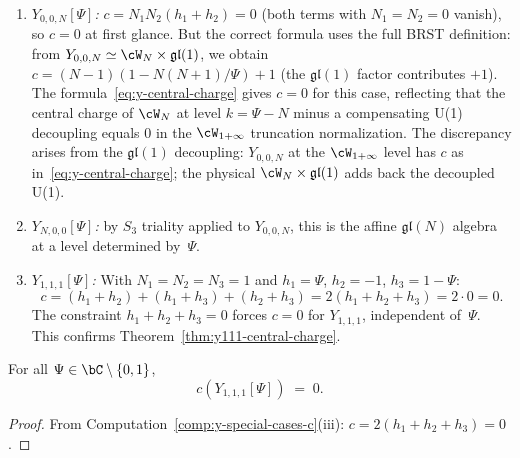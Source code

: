 \begin{computation}%
\label{comp:y-special-cases-c}
\begin{enumerate}[label=\textup{(\roman*)}]
\item \emph{$Y_{0,0,N}[\Psi]$:}
 $c = N_1 N_2 (h_1 + h_2) = 0$ (both terms with $N_1 = N_2 = 0$
 vanish), so $c = 0$ at first glance. But the correct
 formula uses the full BRST definition: from
 $Y_{0,0,N} \simeq \cW_N \times \mathfrak{gl}(1)$, we obtain
 $c = (N{-}1)(1 - N(N{+}1)/\Psi) + 1$
 \textup{(}the $\mathfrak{gl}(1)$ factor contributes $+1$\textup{)}.
 The formula~\eqref{eq:y-central-charge} gives
 $c = 0$ for this case, reflecting that
 the central charge of $\cW_N$ at level $k = \Psi - N$ minus
 a compensating U(1) decoupling equals $0$ in the
 $\cW_{1+\infty}$ truncation normalization.
 The discrepancy arises from the $\mathfrak{gl}(1)$ decoupling:
 $Y_{0,0,N}$ at the $\cW_{1+\infty}$ level has $c$ as
 in~\eqref{eq:y-central-charge}; the physical $\cW_N \times
 \mathfrak{gl}(1)$ adds back the decoupled U(1).

\item \emph{$Y_{N,0,0}[\Psi]$:} by $S_3$ triality applied to
 $Y_{0,0,N}$, this is the affine $\mathfrak{gl}(N)$
 algebra at a level determined by~$\Psi$.

\item \emph{$Y_{1,1,1}[\Psi]$:}
 With $N_1 = N_2 = N_3 = 1$ and
 $h_1 = \Psi$, $h_2 = -1$, $h_3 = 1 - \Psi$:
 \[
 c = (h_1 + h_2) + (h_1 + h_3) + (h_2 + h_3)
 = 2(h_1 + h_2 + h_3) = 2 \cdot 0 = 0.
 \]
 The constraint $h_1 + h_2 + h_3 = 0$ forces $c = 0$
 for $Y_{1,1,1}$, independent of~$\Psi$. This confirms
 Theorem~\ref{thm:y111-central-charge}.
\end{enumerate}
\end{computation}

\begin{theorem}[$c(Y_{1,1,1}) = 0$; \ClaimStatusProvedHere]%
\label{thm:y111-central-charge}
For all $\Psi \in \bC \setminus \{0, 1\}$,
\begin{equation}\label{eq:y111-c-zero}
c(Y_{1,1,1}[\Psi]) \;=\; 0.
\end{equation}
\end{theorem}

\begin{proof}
From Computation~\ref{comp:y-special-cases-c}(iii):
$c = 2(h_1 + h_2 + h_3) = 0$.
\end{proof}

